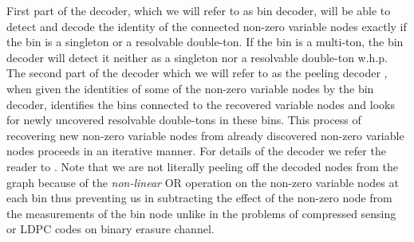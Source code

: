 \documentclass[conference,twocolumn]{IEEEtran}
\begin{document}
{First part of the decoder, which we will refer to as bin decoder, will be able to detect and decode the identity of the connected non-zero variable nodes exactly if the bin is a singleton or a resolvable double-ton. If the bin is a multi-ton, the bin decoder will detect it neither as a singleton nor a resolvable double-ton w.h.p. The second part of the decoder which we will refer to as the peeling decoder \cite{li2015subisit}, when given the identities of some of the non-zero variable nodes by the bin decoder, identifies the bins connected to the recovered variable nodes and looks for newly uncovered resolvable double-tons in these bins. This process of recovering new non-zero variable nodes from already discovered non-zero variable nodes proceeds in an iterative manner. For details of the decoder we refer the reader to \cite{lee2015saffron}. Note that we are not literally peeling off the decoded nodes from the graph because of the \textit{non-linear} OR operation on the non-zero variable nodes at each bin thus preventing us in subtracting the effect of the non-zero node from the measurements of the bin node unlike in the problems of compressed sensing or LDPC codes on binary erasure channel.

}
\end{document}
